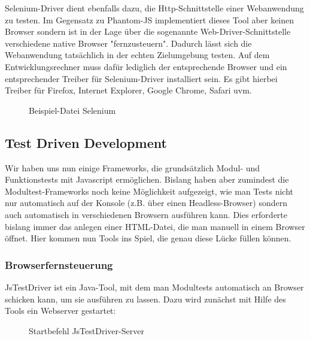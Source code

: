 Selenium-Driver dient ebenfalls dazu, die Http-Schnittstelle einer Webanwendung zu testen. Im Gegensatz zu Phantom-JS implementiert dieses Tool aber keinen Browser sondern ist in der Lage über die sogenannte Web-Driver-Schnittstelle verschiedene native Browser "fernzusteuern". Dadurch lässt sich die Webanwendung tatsächlich in der echten Zielumgebung testen. Auf dem Entwicklungsrechner muss dafür lediglich der entsprechende Browser und ein entsprechender Treiber für Selenium-Driver installiert sein. Es gibt hierbei Treiber für Firefox, Internet Explorer, Google Chrome, Safari uvm.

\begin{figure}[H]
	\begin{center}
		\caption{Beispiel-Datei Selenium}
		\label{code:selenium}
	\end{center}
\end{figure}

\subsection{Test Driven Development}

Wir haben uns nun einige Frameworks, die grundsätzlich Modul- und Funktionstests mit Javascript ermöglichen. Bislang haben aber zumindest die Modultest-Frameworks noch keine Möglichkeit aufgezeigt, wie man Tests nicht nur automatisch auf der Konsole (z.B. über einen Headless-Browser) sondern auch automatisch in verschiedenen Browsern ausführen kann. Dies erforderte bislang immer das anlegen einer HTML-Datei, die man manuell in einem Browser öffnet. Hier kommen nun Tools ins Spiel, die genau diese Lücke füllen können.

\subsubsection{Browserfernsteuerung}

JsTestDriver ist ein Java-Tool, mit dem man Modultests automatisch an Browser schicken kann, um sie ausführen zu lassen. Dazu wird zunächst mit Hilfe des Tools ein Webserver gestartet:

\begin{figure}[H]
	\begin{center}
		\caption{Startbefehl JsTestDriver-Server}
		\label{bash:jstestdriver}
	\end{center}
\end{figure}

